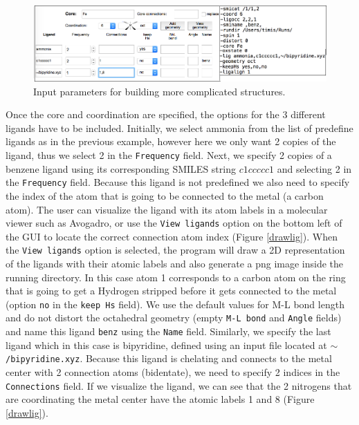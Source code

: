 \documentclass[a4paper,12pt]{assignment}
\begin{document}
\begin{figure}[htb!]
\centering
\includegraphics[width=\textwidth]{./Figures/fig2a.png}
\caption{Input parameters for building more complicated structures.}
\label{multilig}
\end{figure}

Once the core and coordination are specified, the options for the 3 different ligands have to be included. Initially, we select ammonia from the list of predefine ligands as in the previous example, however here we only want 2 copies of the ligand, thus we select 2 in the \texttt{Frequency} field. Next, we specify 2 copies of a benzene ligand using its corresponding SMILES string $c1ccccc1$ and selecting 2 in the \texttt{Frequency} field. Because this ligand is not predefined we also need to specify the index of the atom that is going to be connected to the metal (a carbon atom). The user can visualize the ligand with its atom labels in a molecular viewer such as Avogadro, or use the \texttt{View ligands} option on the bottom left of the GUI to locate the correct connection atom index (Figure \ref{drawlig}). When the \texttt{View ligands} option is selected, the program will draw a 2D representation of the ligands with their atomic labels and also generate a png image inside the running directory. In this case atom 1 corresponds to a carbon atom on the ring that is going to get a Hydrogen stripped before it gets connected to the metal (option \texttt{no} in the \texttt{keep Hs} field). We use the default values for M-L bond length and do not distort the octahedral geometry (empty \texttt{M-L bond} and \texttt{Angle} fields) and name this ligand \texttt{benz} using the \texttt{Name} field. Similarly, we specify the last ligand which in this case is bipyridine, defined using an input file located at \texttt{$\sim$/bipyridine.xyz}. Because this ligand is chelating and connects to the metal center with 2 connection atoms (bidentate), we need to specify 2 indices in the \texttt{Connections} field. If we visualize the ligand, we can see that the 2 nitrogens that are coordinating the metal center have the atomic labels 1 and 8 (Figure \ref{drawlig}).
\end{document}
